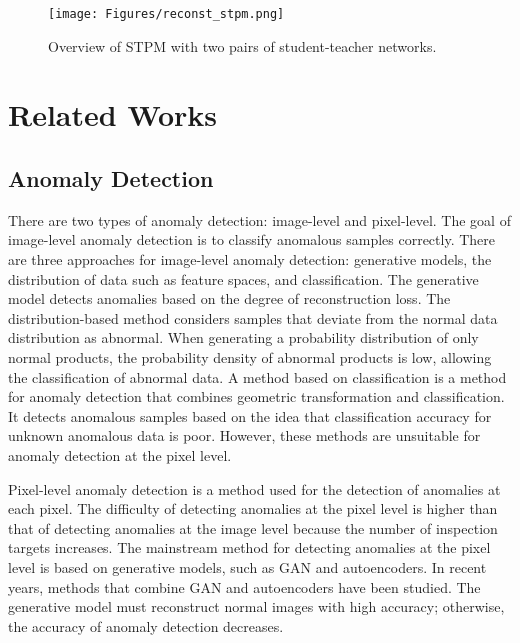 \documentclass[letterpaper, 10 pt, conference]{ieeeconf}
\begin{document}
\begin{figure}[t]
\begin{center}
\vspace{0.2cm}
\texttt{[image: Figures/reconst\_stpm.png]}
\end{center}
\caption{Overview of STPM with two pairs of student-teacher networks. 
}
\label{f3}
\end{figure}



\section{Related Works}


\subsection{Anomaly Detection}

There are two types of anomaly detection: image-level and pixel-level. The goal of image-level anomaly detection is to classify anomalous samples correctly. There are three approaches for image-level anomaly detection: generative models, the distribution of data such as feature spaces, and classification. The generative model detects anomalies based on the degree of reconstruction loss\cite{c16, c17, c18}. The distribution-based method considers samples that deviate from the normal data distribution as abnormal. When generating a probability distribution of only normal products, the probability density of abnormal products is low\cite{c19, c20}, allowing the classification of abnormal data. A method based on classification is a method for anomaly detection that combines geometric transformation and classification\cite{c21}. It detects anomalous samples based on the idea that classification accuracy for unknown anomalous data is poor. However, these methods are unsuitable for anomaly detection at the pixel level.


Pixel-level anomaly detection is a method used for the detection of anomalies at each pixel. The difficulty of detecting anomalies at the pixel level is higher than that of detecting anomalies at the image level because the number of inspection targets increases. The mainstream method for detecting anomalies at the pixel level is based on generative models\cite{c13, c10, c11, c22}, such as GAN and autoencoders. In recent years, methods that combine GAN and autoencoders have been studied\cite{c23, c24, c25}. The generative model must reconstruct normal images with high accuracy; otherwise, the accuracy of anomaly detection decreases. 
\end{document}
